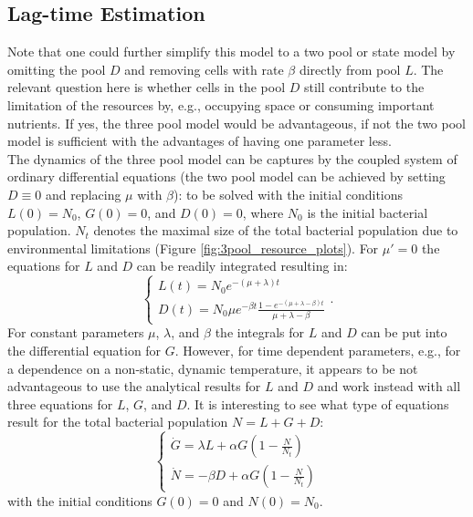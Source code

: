 \documentclass[10pt,A4paper]{article}
\numberwithin{equation}{section}
\begin{document}
\subsection{Lag-time Estimation}
Note that one could further simplify this model to a two pool or state model by omitting the pool $D$ and removing cells with rate $\beta$ directly from pool $L$.
The relevant question here is whether cells in the pool $D$ still contribute to the limitation of the resources by, e.g., occupying space or consuming important nutrients.
If yes, the three pool model would be advantageous, if not the two pool model is sufficient with the advantages of having one parameter less.\\
%
The dynamics of the three pool model can be captures by the coupled system of ordinary differential equations (the two pool model can be achieved by setting $D\equiv 0$ and replacing $\mu$ with $\beta$):
to be solved with the initial conditions $L(0)=N_0$, $G(0)=0$, and $D(0)=0$, where $N_0$ is the initial bacterial population.
$N_t$ denotes the maximal size of the total bacterial population due to environmental limitations (Figure \ref{fig:3pool_resource_plots}).
For $\mu'=0$ the equations for $L$ and $D$ can be readily integrated resulting in:
\begin{equation}
    \begin{cases}
        L(t) = N_0 e^{-(\mu+\lambda)t}\\
        D(t) = N_0 \mu e^{-\beta t}\frac{1-e^{-(\mu+\lambda-\beta)t}}{\mu+\lambda-\beta}
    \end{cases}.
\label{eq:lagtime_deriv1}
\end{equation}
For constant parameters $\mu$, $\lambda$, and $\beta$ the integrals for $L$ and $D$ can be put into the differential equation for $G$.
However, for time dependent parameters, e.g., for a dependence on a non-static, dynamic temperature, it appears to be not advantageous to use the analytical results for $L$ and $D$ and work instead with all three equations for $L$, $G$, and $D$.
It is interesting to see what type of equations result for the total bacterial population $N=L+G+D$:
\begin{equation}
    \begin{cases}
        \dot{G} = \lambda L + \alpha G\left(1-\frac{N}{N_t}\right)\\
        \dot{N} = - \beta D + \alpha G\left(1-\frac{N}{N_t}\right)
    \end{cases}
\label{eq:lagtime_deriv2}
\end{equation}
with the initial conditions $G(0)=0$ and $N(0)=N_0$. 
\end{document}
